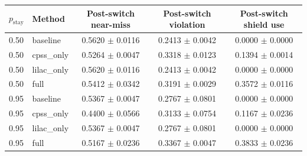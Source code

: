 \begin{tabular}{llccc}
\toprule
$p_{\mathrm{stay}}$ & Method & Post-switch near-miss & Post-switch violation & Post-switch shield use \\
\midrule
0.50 & baseline & 0.5620 $\pm$ 0.0116 & 0.2413 $\pm$ 0.0042 & 0.0000 $\pm$ 0.0000 \\
0.50 & cpss_only & 0.5264 $\pm$ 0.0047 & 0.3318 $\pm$ 0.0123 & 0.1394 $\pm$ 0.0014 \\
0.50 & lilac_only & 0.5620 $\pm$ 0.0116 & 0.2413 $\pm$ 0.0042 & 0.0000 $\pm$ 0.0000 \\
0.50 & full & 0.5412 $\pm$ 0.0342 & 0.3191 $\pm$ 0.0029 & 0.3572 $\pm$ 0.0116 \\
0.95 & baseline & 0.5367 $\pm$ 0.0047 & 0.2767 $\pm$ 0.0801 & 0.0000 $\pm$ 0.0000 \\
0.95 & cpss_only & 0.4400 $\pm$ 0.0566 & 0.3133 $\pm$ 0.0754 & 0.1167 $\pm$ 0.0236 \\
0.95 & lilac_only & 0.5367 $\pm$ 0.0047 & 0.2767 $\pm$ 0.0801 & 0.0000 $\pm$ 0.0000 \\
0.95 & full & 0.5167 $\pm$ 0.0236 & 0.3367 $\pm$ 0.0047 & 0.3833 $\pm$ 0.0236 \\
\bottomrule
\end{tabular}